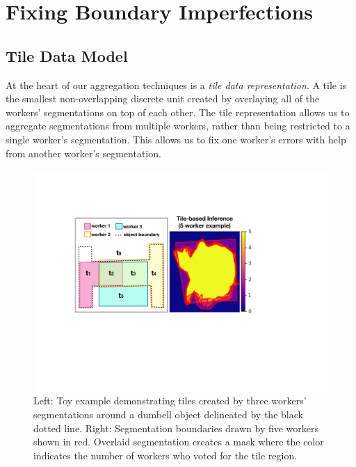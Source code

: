 \section{Fixing Boundary Imperfections\label{precision}}
\subsection{Tile Data Model}
At the heart of our aggregation techniques is a \emph{tile data representation}. A tile is the smallest non-overlapping discrete unit created by overlaying all of the workers' segmentations on top of each other. %
The tile representation allows us to aggregate segmentations from multiple workers, rather than being restricted to a single worker's segmentation. This allows us to fix one worker's errors with help from another worker's segmentation. 
\begin{figure}[h!]
\centering
\includegraphics[width=0.85\linewidth]{plots/tile.pdf}
\caption{Left: Toy example demonstrating tiles created by three workers' segmentations around a dumbell object delineated by the black dotted line. Right: Segmentation boundaries drawn by five workers shown in red. Overlaid segmentation creates a mask where the color indicates the number of workers who voted for the tile region.}
\label{tile_demo}
\end{figure}  

